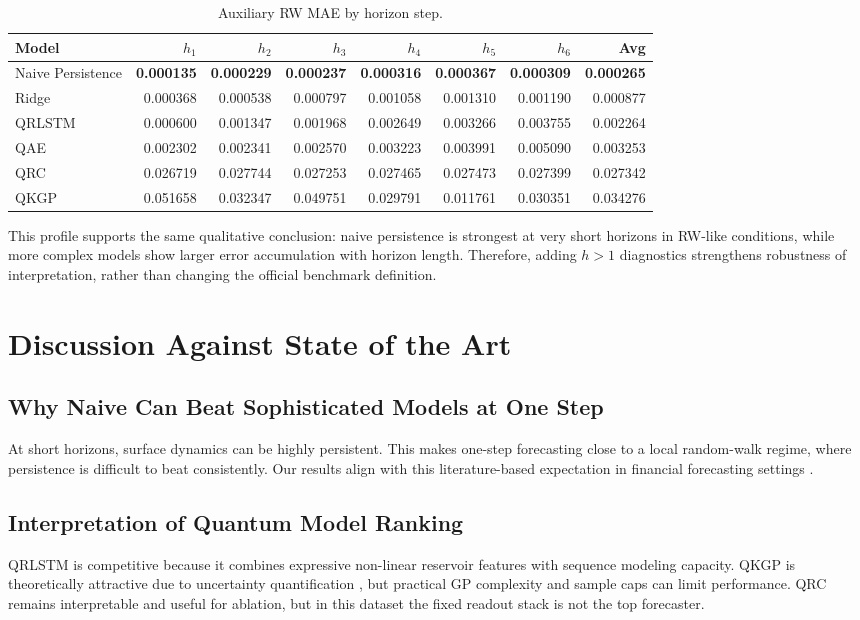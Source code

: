 \documentclass[11pt]{article}
\begin{document}
\begin{table}[H]
\centering
\caption{Auxiliary RW MAE by horizon step.}
\begin{tabular}{lrrrrrrr}
\toprule
Model & \(h_1\) & \(h_2\) & \(h_3\) & \(h_4\) & \(h_5\) & \(h_6\) & Avg \\
\midrule
Naive Persistence & \textbf{0.000135} & \textbf{0.000229} & \textbf{0.000237} & \textbf{0.000316} & \textbf{0.000367} & \textbf{0.000309} & \textbf{0.000265} \\
Ridge & 0.000368 & 0.000538 & 0.000797 & 0.001058 & 0.001310 & 0.001190 & 0.000877 \\
QRLSTM & 0.000600 & 0.001347 & 0.001968 & 0.002649 & 0.003266 & 0.003755 & 0.002264 \\
QAE & 0.002302 & 0.002341 & 0.002570 & 0.003223 & 0.003991 & 0.005090 & 0.003253 \\
QRC & 0.026719 & 0.027744 & 0.027253 & 0.027465 & 0.027473 & 0.027399 & 0.027342 \\
QKGP & 0.051658 & 0.032347 & 0.049751 & 0.029791 & 0.011761 & 0.030351 & 0.034276 \\
\bottomrule
\end{tabular}
\end{table}

This profile supports the same qualitative conclusion: naive persistence is strongest at very short horizons in RW-like conditions, while more complex models show larger error accumulation with horizon length. Therefore, adding \(h>1\) diagnostics strengthens robustness of interpretation, rather than changing the official benchmark definition.

\section{Discussion Against State of the Art}
\subsection{Why Naive Can Beat Sophisticated Models at One Step}
At short horizons, surface dynamics can be highly persistent. This makes one-step forecasting close to a local random-walk regime, where persistence is difficult to beat consistently. Our results align with this literature-based expectation in financial forecasting settings \cite{fama1970efficient,diebold2006yield}.

\subsection{Interpretation of Quantum Model Ranking}
QRLSTM is competitive because it combines expressive non-linear reservoir features with sequence modeling capacity. QKGP is theoretically attractive due to uncertainty quantification \cite{rasmussen2006gp}, but practical GP complexity and sample caps can limit performance. QRC remains interpretable and useful for ablation, but in this dataset the fixed readout stack is not the top forecaster.
\end{document}
